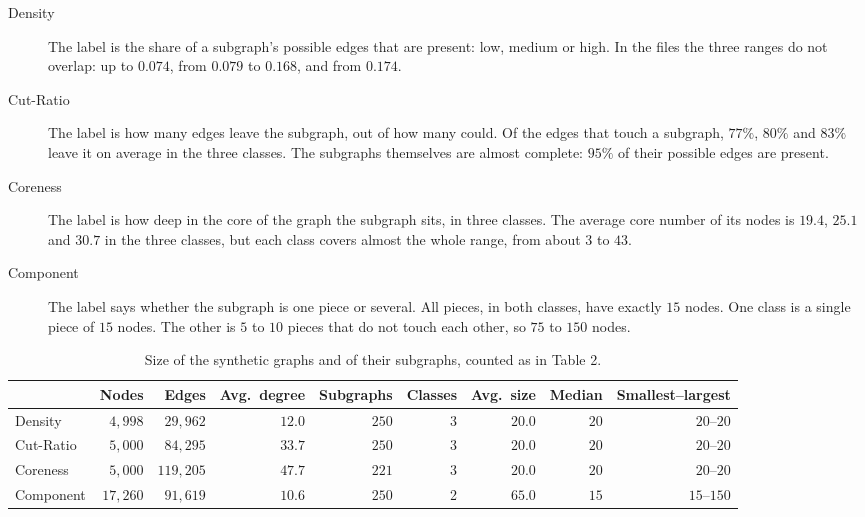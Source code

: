 \documentclass[11pt]{article}
\begin{document}
\begin{description}
\item[Density] The label is the share of a subgraph's possible edges that are present:
low, medium or high. In the files the three ranges do not overlap: up to $0.074$, from
$0.079$ to $0.168$, and from $0.174$.
\item[Cut-Ratio] The label is how many edges leave the subgraph, out of how many could. Of
the edges that touch a subgraph, $77\%$, $80\%$ and $83\%$ leave it on average in the three
classes. The subgraphs themselves are almost complete: $95\%$ of their possible edges are
present.
\item[Coreness] The label is how deep in the core of the graph the subgraph sits, in three
classes. The average core number of its nodes is $19.4$, $25.1$ and $30.7$ in the three
classes, but each class covers almost the whole range, from about $3$ to $43$.
\item[Component] The label says whether the subgraph is one piece or several. All pieces,
in both classes, have exactly $15$ nodes. One class is a single piece of $15$ nodes. The
other is $5$ to $10$ pieces that do not touch each other, so $75$ to $150$ nodes.
\end{description}

\begin{table}[H]
\centering
\small
\begin{tabular}{lrrrrrrrr}
\toprule
 & Nodes & Edges & Avg.\ degree & Subgraphs & Classes & Avg.\ size & Median & Smallest--largest \\
\midrule
Density & $4{,}998$ & $29{,}962$ & $12.0$ & $250$ & 3 & $20.0$ & $20$ & $20$--$20$ \\
Cut-Ratio & $5{,}000$ & $84{,}295$ & $33.7$ & $250$ & 3 & $20.0$ & $20$ & $20$--$20$ \\
Coreness & $5{,}000$ & $119{,}205$ & $47.7$ & $221$ & 3 & $20.0$ & $20$ & $20$--$20$ \\
Component & $17{,}260$ & $91{,}619$ & $10.6$ & $250$ & 2 & $65.0$ & $15$ & $15$--$150$ \\
\bottomrule
\end{tabular}
\caption{Size of the synthetic graphs and of their subgraphs, counted as in Table 2.}
\end{table}
\end{document}
